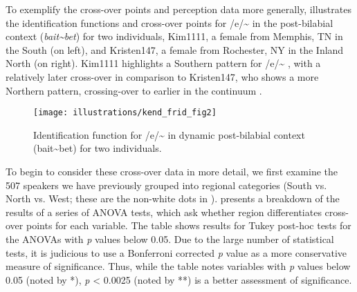\documentclass[output=paper]{LSP/langsci}
\begin{document}
To exemplify the cross-over points and perception data more generally,  illustrates the identification functions and cross-over points for /e/\~{}
in the post-bilabial context (\textit{bait\~{}bet}) for two individuals, Kim1111, a female from Memphis, TN in the South (on left), and Kristen147, a female from Rochester, NY in the Inland North (on right). Kim1111 highlights a Southern pattern for /e/\~{}
, with a relatively later cross-over in comparison to Kristen147, who shows a more Northern pattern, crossing-over to 
earlier in the continuum \citep{kendall_variation_2012}.

\begin{figure}
\texttt{[image: illustrations/kend\_frid\_fig2]}
\caption{Identification function for /e/\~{}
in dynamic post-bilabial context (bait\~{}bet) for two individuals.}
\label{fig:2}
\end{figure}

To begin to consider these cross-over data in more detail, we first examine the 507 speakers we have previously grouped into regional categories (South vs. North vs. West; these are the non-white dots in ).  presents a breakdown of the results of a series of ANOVA tests, which ask whether region differentiates cross-over points for each variable. The table shows results for Tukey post-hoc tests for the ANOVAs with \textit{p }values below 0.05. Due to the large number of statistical tests, it is judicious to use a Bonferroni corrected \textit{p }value as a more conservative measure of significance. Thus, while the table notes variables with \textit{p }values below 0.05 (noted by *), \textit{p }{\textless} 0.0025 (noted by **) is a better assessment of significance.
\end{document}
